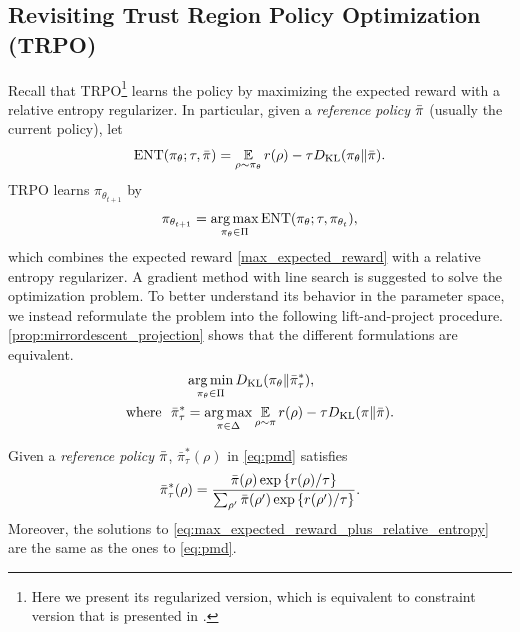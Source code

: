 \documentclass{article} %
\begin{document}
\subsection{Revisiting Trust Region Policy Optimization (TRPO)}
Recall that TRPO\footnote{Here we present its regularized version, which is equivalent to constraint version that is presented in \citet{schulman2015trust}. } learns the policy by maximizing the expected reward with a relative entropy regularizer.
In particular, given a \emph{reference policy} $\bar{\pi}$ (usually the current policy), let 
\begin{equation*}
\text{ENT}(\pi_\theta; \tau, \bar{\pi}) = { \operatorname*{\mathbb{E}}\limits_{\rho \sim \pi_\theta}{  r(\rho)  - \tau D_{\mathrm{KL}}(\pi_\theta \| \bar{\pi}) } }.
\end{equation*}
TRPO learns $\pi_{\theta_{t+1}} $ by 
\begin{equation}
\label{eq:max_expected_reward_plus_relative_entropy}
\pi_{\theta_{t+1}} = \operatorname*{arg\,max}\limits_{\pi_\theta \in \Pi}  \text{ENT}(\pi_\theta; \tau, \pi_{\theta_t}), 
\end{equation}
which combines the expected reward \cref{max_expected_reward} with a relative entropy regularizer. 
A gradient method with line search is suggested to solve the optimization problem. 
To better understand its behavior in the parameter space, we instead reformulate the problem into the following lift-and-project procedure. \cref{prop:mirrordescent_projection} shows that the different formulations are equivalent.
\begin{equation}
\label{eq:pmd}
\begin{split}
&\operatorname*{arg\,min}\limits_{\pi_\theta \in \Pi}{D_{\mathrm{KL}}( \pi_\theta \| \bar{\pi}_{\tau}^* )}, \\
\text{where}\ \ \bar{\pi}_{\tau}^* & =  \operatorname*{arg\,max}\limits_{\pi \in \Delta}{ \operatorname*{\mathbb{E}}\limits_{\rho \sim \pi}{  r(\rho)  - \tau D_{\mathrm{KL}}(\pi \| \bar{\pi}) } }.
\end{split}
\end{equation}
\begin{prop}
\label{prop:mirrordescent_projection}
Given a \emph{reference policy} $\bar{\pi}$,  $\bar{\pi}_\tau^*(\rho)$ in \cref{eq:pmd} satisfies
\begin{equation}
\label{eq:pitaustar}
\bar{\pi}_\tau^*(\rho) =  \frac{\bar{\pi}(\rho) \exp\left\{ r(\rho) / \tau \right\}}{ \sum_{\rho^{\prime}}{\bar{\pi}(\rho^{\prime}) \exp\left\{ r(\rho^{\prime}) / \tau \right\} } }.
\end{equation}
Moreover, the solutions to \cref{eq:max_expected_reward_plus_relative_entropy} are the same as the ones to \cref{eq:pmd}.
\end{prop}
\end{document}
